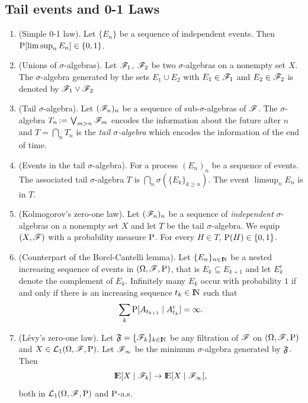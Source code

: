 \documentclass[a4paper,10pt]{article}
\begin{document}
\subsection{Tail events and 0-1 Laws}
\begin{enumerate}

 \item (Simple 0-1 law). Let $\{E_n\}$ be a sequence of independent events. Then $\mathrm{P}[\limsup_n E_n]\in \{0,1\}$.
 \item (Unions of $\sigma$-algebras). Let $\mathscr{F}_1$, $\mathscr{F}_2$ be two $\sigma$-algebras on a nonempty set $X$.
       The $\sigma$-algebra generated by the sets $E_1\cup E_2$ with $E_1\in\mathscr{F}_1$ and $E_2\in\mathscr{F}_2$ is 
       denoted by $\mathscr{F}_1 \vee \mathscr{F}_2$
 
 \item (Tail $\sigma$-algebra). Let $(\mathscr{F}_n)_{n}$ be a sequence of sub-$\sigma$-algebras of $\mathscr{F}$.
       The $\sigma$-algebra $T_n{}\mathop{\mathrel{:}=}{} \bigvee_{m>n}\mathscr{F}_m$ encodes the information about the future 
       after $n$ and $T=\bigcap_n T_n$ is the \textit{tail $\sigma$-algebra} which encodes the 
       information of the end of time. 
       
 \item (Events in the tail $\sigma$-algebra). For a process $(E_n)_n$ be a sequence of events. 
       The associated tail $\sigma$-algebra $T$ is $\bigcap_n \sigma(\{E_k\}_{k\geq n})$.
       The event $\limsup_n E_n$ is in $T$.
 
 \item (Kolmogorov's zero-one law). Let $(\mathscr{F}_n)_n$ be a sequence of \textit{independent}
       $\sigma$-algebras on a nonempty set $X$ and let $T$ be the tail $\sigma$-algebra.
       We equip $(X,\mathscr{F})$ with a probability measure $\mathrm{P}$. For every $H\in T$,
       $\mathrm{P}(H)\in\{0,1\}$.
 
 \item (Counterpart of the Borel-Cantelli lemma). 
 Let $\{E_n\}_{n\in\N}$ be a nested increasing sequence of events in $(\Omega,\mathscr{F},\mathrm{P})$, that is 
 $E_k\subseteq E_{k+1}$ and let $E_k^c$ denote the complement of $E_k$.
 Infinitely many $E_k$ occur with probability $1$ if and only if there is an increasing sequence 
 $t_k\in\N$ such that
 \[
  \sum_k \mathrm{P}[A_{t_{k+1}}\mid A_{t_k}^c]  = \infty.
 \] 
 
 \item (L\'evy's zero-one law). Let $\Ff=\{\F_k\}_{k\in\N}$ be any filtration of $\mathscr{F}$ on $(\Omega,\mathscr{F},\mathrm{P})$ and
 $X\in\mathcal{L}_1(\Omega,\mathscr{F},\mathrm{P})$. Let $\mathscr{F}_\infty$ be the minimum $\sigma$-algebra generated by $\mathfrak{F}$. Then
 \[
  \E[X\mid \F_k] \to \E[X\mid \F_\infty], 
 \]
 both in $\mathcal{L}_1(\Omega,\mathscr{F},\mathrm{P})$ and $\mathrm{P}$-a.s.
\end{enumerate}
\end{document}
